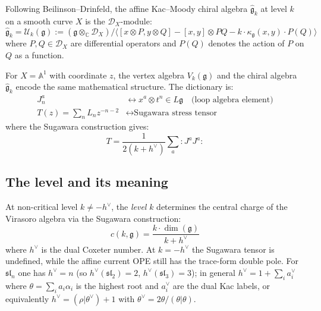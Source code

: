 \begin{definition}\label{def:chiral-kac-moody}
Following Beilinson--Drinfeld, the affine Kac--Moody chiral algebra $\widehat{\mathfrak{g}}_k$ at level $k$ on a smooth curve $X$ is the $\mathcal{D}_X$-module:
\begin{equation}
\widehat{\mathfrak{g}}_k = \mathcal{U}_k(\mathfrak{g}) := \left(\mathfrak{g} \otimes_{\mathbb{C}} \mathcal{D}_X\right) / \langle [x \otimes P, y \otimes Q] - [x,y] \otimes PQ - k \cdot \kappa_{\mathfrak{g}}(x,y) \cdot P(Q) \rangle
\end{equation}
where $P, Q \in \mathcal{D}_X$ are differential operators and $P(Q)$ denotes the action of $P$ on $Q$ as a function.
\end{definition}

\begin{theorem}\label{thm:vertex-chiral-equivalence}
For $X = \mathbb{A}^1$ with coordinate $z$, the vertex algebra $V_k(\mathfrak{g})$ and the chiral algebra $\widehat{\mathfrak{g}}_k$ encode the same mathematical structure. The dictionary is:
\begin{align}
J^a_n &\longleftrightarrow x^a \otimes t^n \in L\mathfrak{g} \quad \text{(loop algebra element)} \\
T(z) = \sum_n L_n z^{-n-2} &\longleftrightarrow \text{Sugawara stress tensor}
\end{align}
where the Sugawara construction gives:
\begin{equation}
T = \frac{1}{2(k+h^\vee)} \sum_a {:}J^a J^a{:}
\end{equation}
\end{theorem}

\subsection{The level and its meaning}

\begin{definition}
At non-critical level $k\neq -h^\vee$, the \emph{level} $k$
determines the central charge of the Virasoro algebra via the
Sugawara construction:
\begin{equation}
c(k, \mathfrak{g}) = \frac{k \cdot \dim(\mathfrak{g})}{k + h^\vee}
\end{equation}
where $h^\vee$ is the dual Coxeter number. At $k=-h^\vee$ the
Sugawara tensor is undefined, while the affine current OPE still has
the trace-form double pole. For $\mathfrak{sl}_n$ one has
$h^\vee = n$ (so $h^\vee(\mathfrak{sl}_2) = 2$,
$h^\vee(\mathfrak{sl}_3) = 3$); in general
$h^\vee = 1 + \sum_i a_i^\vee$ where
$\theta = \sum_i a_i \alpha_i$ is the highest root and $a_i^\vee$
are the dual Kac labels, or equivalently
$h^\vee = (\rho|\theta^\vee) + 1$ with
$\theta^\vee = 2\theta/(\theta|\theta)$.
\end{definition}

